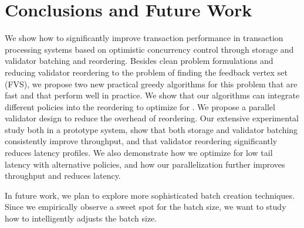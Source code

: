 \section{Conclusions and Future Work}\label{sec:conclusion}

We show how to significantly improve transaction performance in transaction processing systems based on optimistic concurrency control through storage and validator batching and reordering. Besides clean problem formulations and
reducing validator reordering to the problem of finding the  feedback vertex set (FVS), we propose two new practical greedy algorithms for this problem
that are fast and that perform well in practice. We show that our algorithms can integrate different policies into the reordering to optimize for . We  propose a parallel validator design to reduce the overhead of reordering. Our extensive experimental study both in a prototype system,  show that both storage and validator batching consistently improve throughput, and that validator reordering 
significantly reduces latency profiles. We also demonstrate how we optimize for low tail latency with alternative policies, and how our parallelization further improves
throughput and reduces latency.

In future work, we plan to explore more sophisticated batch creation techniques. Since we empirically observe a sweet spot for the  batch size, we want to study how to intelligently adjusts the batch size. 
